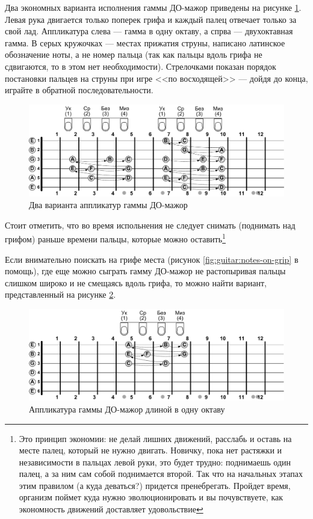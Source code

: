 Два экономных варианта исполнения гаммы ДО-мажор приведены на рисунке \ref{fig:harmony:scales:c:dur1}. Левая рука двигается только поперек грифа и каждый палец отвечает только за свой лад. Аппликатура слева --- гамма в одну октаву, а спрва --- двухоктавная гамма. В серых кружочках --- местах прижатия струны, написано латинское обозначение ноты, а не номер пальца (так как пальцы вдоль грифа не сдвигаются, то в этом нет необходимости). Стрелочками показан порядок постановки пальцев на струны при игре <<по восходящей>> --- дойдя до конца, играйте в обратной последовательности.

\begin{figure}[!ht]
    \centering
    \includegraphics[width=\textwidth]{fig/intervals/c-dur-csale-1} 
    \caption{Два варианта аппликатур гаммы ДО-мажор}\label{fig:harmony:scales:c:dur1}
\end{figure} 

Стоит отметить, что во время испольнения не следует снимать (поднимать над грифом) раньше времени пальцы, которые можно оставить\footnote{Это принцип экономии: не делай лишних движений, расслабь и оставь на месте палец, который не нужно двигать. Новичку, пока нет растяжки и независимости в пальцах левой руки, это будет трудно: поднимаешь один палец, а за ним сам собой поднимается второй. Так что на начальных этапах этим правилом (а куда деваться?) придется пренебрегать. Пройдет время, организм поймет куда нужно эволюционировать и вы почувствуете, как экономность движений доставляет удовольствие}

Если внимательно поискать на грифе места (рисунок \ref{fig:guitar:notes-on-grip} в помощь), где еще можно сыграть гамму ДО-мажор не растопыривая пальцы слишком широко и не смещаясь вдоль грифа, то можно найти вариант, представленный на рисунке \ref{fig:harmony:scales:c:dur2}.

\begin{figure}[!ht]
    \centering
    \includegraphics[width=\textwidth]{fig/intervals/c-dur-csale-2} 
    \caption{Аппликатура гаммы ДО-мажор длиной в одну октаву}\label{fig:harmony:scales:c:dur2}
\end{figure} 

